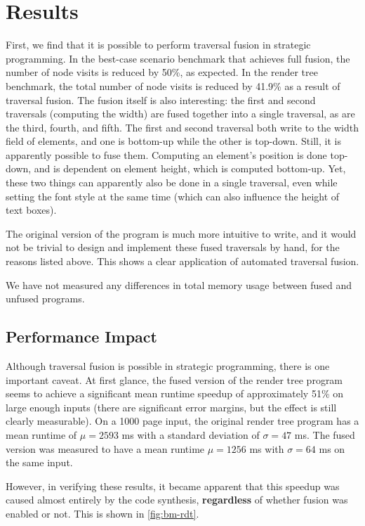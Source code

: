 \section{Results}
First, we find that it is possible to perform traversal fusion in strategic programming. In the best-case scenario benchmark that achieves full fusion, the number of node visits is reduced by 50\%, as expected. In the render tree benchmark, the total number of node visits is reduced by 41.9\% as a result of traversal fusion. The fusion itself is also interesting: the first and second traversals (computing the width) are fused together into a single traversal, as are the third, fourth, and fifth. The first and second traversal both write to the width field of elements, and one is bottom-up while the other is top-down. Still, it is apparently possible to fuse them. Computing an element's position is done top-down, and is dependent on element height, which is computed bottom-up. Yet, these two things can apparently also be done in a single traversal, even while setting the font style at the same time (which can also influence the height of text boxes).

The original version of the program is much more intuitive to write, and it would not be trivial to design and implement these fused traversals by hand, for the reasons listed above. This shows a clear application of automated traversal fusion.

We have not measured any differences in total memory usage between fused and unfused programs.

\subsection{Performance Impact}
Although traversal fusion is possible in strategic programming, there is one important caveat. At first glance, the fused version of the render tree program seems to achieve a significant mean runtime speedup of approximately 51\% on large enough inputs (there are significant error margins, but the effect is still clearly measurable). On a 1000 page input, the original render tree program has a mean runtime of $\mu=2593$ ms with a standard deviation of $\sigma = 47$ ms. The fused version was measured to have a mean runtime $\mu = 1256$ ms with $\sigma = 64$ ms on the same input.

However, in verifying these results, it became apparent that this speedup was caused almost entirely by the code synthesis, \textbf{regardless} of whether fusion was enabled or not. This is shown in \autoref{fig:bm-rdt}.

